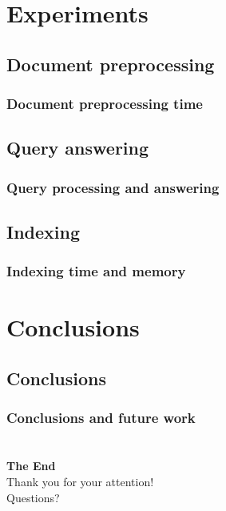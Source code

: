 \documentclass{beamer}
\begin{document}
\section{Experiments}
\subsection{Document preprocessing}

\begin{frame}
\frametitle{Document preprocessing time}
\end{frame}

\subsection{Query answering}

\begin{frame}
\frametitle{Query processing and answering}
\end{frame}

\subsection{Indexing}

\begin{frame}
\frametitle{Indexing time and memory}
\end{frame}

\section{Conclusions}
\subsection{Conclusions}

\begin{frame}
\frametitle{Conclusions and future work}
\end{frame}

\section*{}
\begin{frame}
\begin{center}
{\bfseries The End\\}
Thank you for your attention!\\
Questions?
\end{center}
\end{frame}
\end{document}
